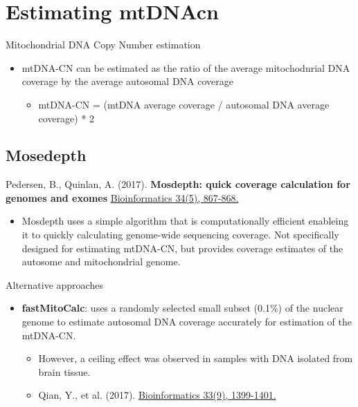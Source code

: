 \documentclass[]{book}
\providecommand{\tightlist}{%
  \setlength{\itemsep}{0pt}\setlength{\parskip}{0pt}}
\begin{document}
\hypertarget{estimating-mtdnacn}{%
\section{Estimating mtDNAcn}\label{estimating-mtdnacn}}

Mitochondrial DNA Copy Number estimation

\begin{itemize}
\tightlist
\item
  mtDNA-CN can be estimated as the ratio of the average mitochodnrial DNA coverage by the average autosomal DNA coverage

  \begin{itemize}
  \tightlist
  \item
    mtDNA-CN = (mtDNA average coverage / autosomal DNA average coverage) * 2
  \end{itemize}
\end{itemize}

\hypertarget{mosedepth}{%
\subsection{Mosedepth}\label{mosedepth}}

Pedersen, B., Quinlan, A. (2017). \textbf{Mosdepth: quick coverage calculation for genomes and exomes} \href{https://dx.doi.org/10.1093/bioinformatics/btx699}{Bioinformatics 34(5), 867-868.}

\begin{itemize}
\tightlist
\item
  Mosdepth uses a simple algorithm that is computationally efficient enableing it to quickly calculating genome-wide sequencing coverage. Not specifically designed for estimating mtDNA-CN, but provides coverage estimates of the autosome and mitochondrial genome.
\end{itemize}

Alternative approaches

\begin{itemize}
\tightlist
\item
  \textbf{fastMitoCalc}: uses a randomly selected small subset (0.1\%) of the nuclear genome to estimate autosomal DNA coverage accurately for estimation of the mtDNA-CN.

  \begin{itemize}
  \tightlist
  \item
    However, a ceiling effect was observed in samples with DNA isolated from brain tissue.
  \item
    Qian, Y., et al. (2017). \href{https://dx.doi.org/10.1093/bioinformatics/btw835}{Bioinformatics 33(9), 1399-1401.}
  \end{itemize}
\end{itemize}
\end{document}
